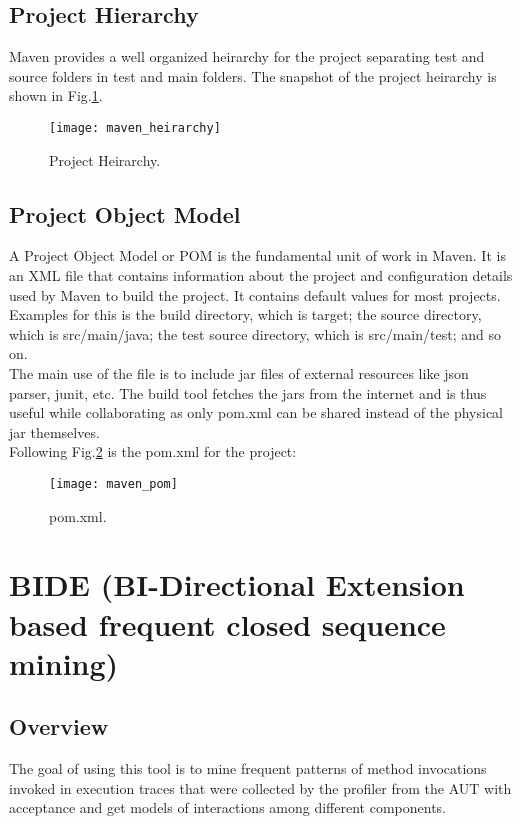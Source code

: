 \subsection{Project Hierarchy}
Maven provides a well organized heirarchy for the project separating test and source folders in test and main folders.
The snapshot of the project heirarchy is shown in Fig.\ref{heirarchy}.

\begin{figure}[h]
\centering
 \texttt{[image: maven\_heirarchy]}
\caption{Project Heirarchy.}
\label{heirarchy}
\end{figure}

\subsection{Project Object Model}
A Project Object Model or POM\cite{pom} is the fundamental unit of work in Maven. It is an XML file that contains information about the project and configuration details used by Maven to build the project. It contains default values for most projects. Examples for this is the build directory, which is target; the source directory, which is src/main/java; the test source directory, which is src/main/test; and so on.\\

The main use of the file is to include jar files of external resources like json parser, junit, etc. The build tool fetches the jars from the internet and is thus useful while collaborating as only pom.xml can be shared instead of the physical jar themselves.\\


Following Fig.\ref{pom} is the pom.xml for the project:
\begin{figure}[h]
\centering
 \texttt{[image: maven\_pom]}
\caption{pom.xml.}
\label{pom}
\end{figure}

\section{BIDE (BI-Directional Extension based frequent closed sequence mining)}
\subsection{Overview}
The goal of using this tool is to mine frequent patterns of method invocations invoked in execution traces that were collected by the profiler from the AUT with acceptance and get models of interactions among different components.

